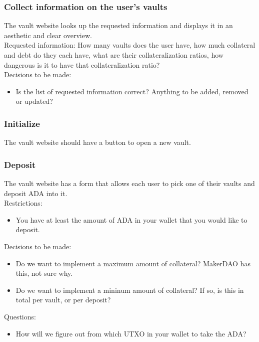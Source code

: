 \documentclass{article} %
\begin{document}
\subsubsection{Collect information on the user's vaults}

The vault website looks up the requested information and displays it in an
aesthetic and clear overview. \\

Requested information: How many vaults does the user have, how much collateral
and debt do they each have, what are their collateralization ratios, how
dangerous is it to have that collateralization ratio? \\

Decisions to be made:
\begin{itemize}
  \item Is the list of requested information correct? Anything to be added,
    removed or updated?
\end{itemize}

\subsubsection{Initialize}

The vault website should have a button to open a new vault.

\subsubsection{Deposit}

The vault website has a form that allows each user to pick one of their vaults
and deposit ADA into it. \\

Restrictions:
\begin{itemize}
  \item You have at least the amount of ADA in your wallet that you would like
    to deposit.
\end{itemize}

Decisions to be made:
\begin{itemize}
  \item Do we want to implement a maximum amount of collateral? MakerDAO has
    this, not sure why.
  \item Do we want to implement a mininum amount of collateral? If so, is this
    in total per vault, or per deposit?
\end{itemize}

Questions:
\begin{itemize}
  \item How will we figure out from which UTXO in your wallet to take the ADA?
\end{itemize}
\end{document}
